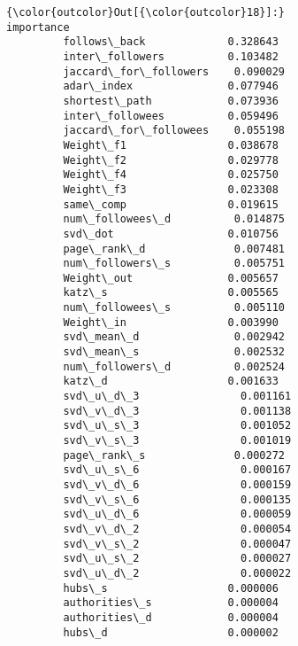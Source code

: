 \documentclass[11pt]{article}
\begin{document}
\begin{Verbatim}[commandchars=\\\{\}]
{\color{outcolor}Out[{\color{outcolor}18}]:}                        importance
         follows\_back             0.328643
         inter\_followers          0.103482
         jaccard\_for\_followers    0.090029
         adar\_index               0.077946
         shortest\_path            0.073936
         inter\_followees          0.059496
         jaccard\_for\_followees    0.055198
         Weight\_f1                0.038678
         Weight\_f2                0.029778
         Weight\_f4                0.025750
         Weight\_f3                0.023308
         same\_comp                0.019615
         num\_followees\_d          0.014875
         svd\_dot                  0.010756
         page\_rank\_d              0.007481
         num\_followers\_s          0.005751
         Weight\_out               0.005657
         katz\_s                   0.005565
         num\_followees\_s          0.005110
         Weight\_in                0.003990
         svd\_mean\_d               0.002942
         svd\_mean\_s               0.002532
         num\_followers\_d          0.002524
         katz\_d                   0.001633
         svd\_u\_d\_3                0.001161
         svd\_v\_d\_3                0.001138
         svd\_u\_s\_3                0.001052
         svd\_v\_s\_3                0.001019
         page\_rank\_s              0.000272
         svd\_u\_s\_6                0.000167
         svd\_v\_d\_6                0.000159
         svd\_v\_s\_6                0.000135
         svd\_u\_d\_6                0.000059
         svd\_v\_d\_2                0.000054
         svd\_v\_s\_2                0.000047
         svd\_u\_s\_2                0.000027
         svd\_u\_d\_2                0.000022
         hubs\_s                   0.000006
         authorities\_s            0.000004
         authorities\_d            0.000004
         hubs\_d                   0.000002
\end{Verbatim}
            

    
    
    
    
\end{document}
